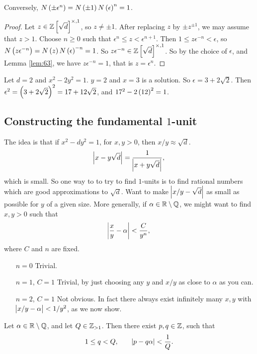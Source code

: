 Conversely, $ N\br{\pm \epsilon^n} = N\br{\pm 1}N\br{\epsilon}^n = 1 $.

\begin{proof}
Let $ z \in \Z\sbr{\sqrt{d}}^{\times, 1} $, so $ z \ne \pm 1 $. After replacing $ z $ by $ \pm z^{\pm 1} $, we may assume that $ z > 1 $. Choose $ n \ge 0 $ such that $ \epsilon^n \le z < \epsilon^{n + 1} $. Then $ 1 \le z\epsilon^{-n} < \epsilon $, so $ N\br{z\epsilon^{-n}} = N\br{z}N\br{\epsilon}^{-n} = 1 $. So $ z\epsilon^{-n} \in \Z\sbr{\sqrt{d}}^{\times, 1} $. So by the choice of $ \epsilon $, and Lemma \ref{lem:63}, we have $ z\epsilon^{-n} = 1 $, that is $ z = \epsilon^n $.
\end{proof}

\begin{example*}
Let $ d = 2 $ and $ x^2 - 2y^2 = 1 $. $ y = 2 $ and $ x = 3 $ is a solution. So $ \epsilon = 3 + 2\sqrt{2} $. Then $ \epsilon^2 = \br{3 + 2\sqrt{2}}^2 = 17 + 12\sqrt{2} $, and $ 17^2 - 2\br{12}^2 = 1 $.
\end{example*}

\pagebreak

\subsection{Constructing the fundamental $ 1 $-unit}

The idea is that if $ x^2 - dy^2 = 1 $, for $ x, y > 0 $, then $ x / y \approx \sqrt{d} $.
$$ \abs{x - y\sqrt{d}} = \dfrac{1}{\abs{x + y\sqrt{d}}}, $$
which is small. So one way to to try to find $ 1 $-units is to find rational numbers which are good approximations to $ \sqrt{d} $. Want to make $ \abs{x / y - \sqrt{d}} $ as small as possible for $ y $ of a given size. More generally, if $ \alpha \in \mathbb{R} \setminus \mathbb{Q} $, we might want to find $ x, y > 0 $ such that
$$ \abs{\dfrac{x}{y} - \alpha} < \dfrac{C}{y^n}, $$
where $ C $ and $ n $ are fixed.
\begin{itemize}[leftmargin=1in]
\item[$ n = 0 $] Trivial.
\item[$ n = 1 $, $ C = 1 $] Trivial, by just choosing any $ y $ and $ x / y $ as close to $ \alpha $ as you can.
\item[$ n = 2 $, $ C = 1 $] Not obvious. In fact there always exist infinitely many $ x, y $ with $ \abs{x / y - \alpha} < 1 / y^2 $, as we now show.
\end{itemize}

\begin{theorem}
\label{thm:65}
Let $ \alpha \in \mathbb{R} \setminus \mathbb{Q} $, and let $ Q \in \mathbb{Z}_{> 1} $. Then there exist $ p, q \in \mathbb{Z} $, such that
$$ 1 \le q < Q, \qquad \abs{p - q\alpha} < \dfrac{1}{Q}. $$
\end{theorem}


